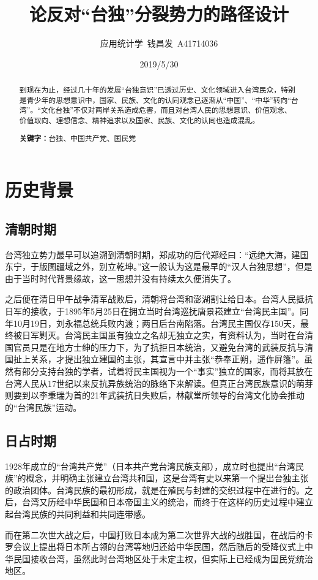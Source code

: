 \documentclass[11pt,a4paper]{ctexart}
\author{应用统计学\ 钱昌发\ A41714036}
\title{论反对“台独”分裂势力的路径设计}
\date{2019/5/30}
\begin{document}
  \maketitle%
  \newpage%
  \tableofcontents%
  \newpage
  \begin{abstract}
  	到现在为止，经过几十年的发展“台独意识”已透过历史、文化领域进入台湾民众，特别是青少年的思想意识中，国家、民族、文化的认同观念已逐渐从“中国”、“中华”转向“台湾”。“文化台独”不仅对两岸关系造成危害，而且对台湾人民的思想意识、价值观念、价值取向、理想信念、精神追求以及国家、民族、文化的认同也造成混乱。
  \newline%

  \centering%
  \textbf{关键字：}台独、中国共产党、国民党
  \end{abstract}

  \section{历史背景}
    \subsection{清朝时期} 
    台湾独立势力最早可以追溯到清朝时期，郑成功的后代郑经曰：“远绝大海，建国东宁，于版图疆域之外，别立乾坤。”这一般认为这是最早的“汉人台独思想”，但是由于当时时代背景缘故，这一思想并没有持续太久便消失了。\par
    之后便在清日甲午战争清军战败后，清朝将台湾和澎湖割让给日本。台湾人民抵抗日军的接收，于1895年5月25日在拥立当时台湾巡抚唐景崧建立“台湾民主国”。同年10月19日，刘永福总统兵败内渡；两日后台南陷落。台湾民主国仅存150天，最终被日军剿灭。台湾民主国虽有独立之名却无独立之实，有资料认为，当时在台清国官员只是在地方士绅的压力下，为了抗拒日本统治，又避免台湾的武装反抗与清国扯上关系，才提出独立建国的主张，其宣言中并主张“恭奉正朔，遥作屏籓”。虽然有部分支持台独的学者，试着将民主国视为一个“事实”独立的国家，而将其放在台湾人民从17世纪以来反抗异族统治的脉络下来解读。但真正台湾民族意识的萌芽则要到以李秉瑞为首的21年武装抗日失败后，林献堂所领导的台湾文化协会推动的“台湾民族”运动。\cite{q1}
    
     \subsection{日占时期} 
     1928年成立的“台湾共产党”（日本共产党台湾民族支部），成立时也提出“台湾民族”的概念，并明确主张建立台湾共和国，这是台湾有史以来第一个提出台独主张的政治团体。台湾民族的最初形成，就是在殖民与封建的交织过程中在进行的。之后，台湾又历经中华民国和日本帝国主义的统治，而终于在这样的历史过程中建立起台湾民族的共同利益和共同连带感。\par
     而在第二次世大战之后，中国打败日本成为第二次世界大战的战胜国，在战后的卡罗会议上提出将日本所占领的台湾等地归还给中华民国，然后随后的受降仪式上中华民国接收台湾，虽然此时台湾地区处于未定主权，但实际上已经成为国民党统治地区。
\end{document}
